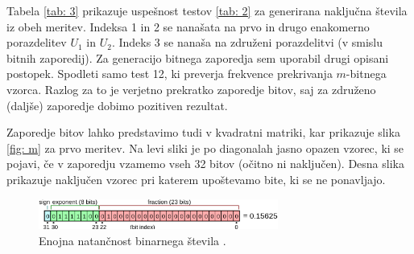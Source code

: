 \documentclass[11pt, oneside]{article}
\theoremstyle{definition}
\begin{document}
Tabela \ref{tab: 3} prikazuje uspešnost testov \ref{tab: 2} za generirana naključna števila iz obeh meritev.
Indeksa 1 in 2 se nanašata na prvo in drugo enakomerno porazdelitev $U_1$ in $U_2$.
Indeks 3 se nanaša na združeni porazdelitvi (v smislu bitnih zaporedij).
Za generacijo bitnega zaporedja sem uporabil drugi opisani postopek.
Spodleti samo test 12, ki preverja frekvence prekrivanja $m$-bitnega vzorca. Razlog za to je
verjetno prekratko zaporedje bitov, saj za združeno (daljše) zaporedje dobimo pozitiven rezultat.

Zaporedje bitov lahko predstavimo tudi v kvadratni matriki, kar prikazuje slika \ref{fig: m} za
prvo meritev. Na levi sliki je po diagonalah jasno opazen vzorec, ki se pojavi, če v zaporedju
vzamemo vseh 32 bitov (očitno ni naključen). Desna slika prikazuje naključen vzorec pri katerem upoštevamo bite, ki se
ne ponavljajo.

\newpage

\vspace*{-1cm}
\begin{figure}[h!]
    \centering
    \includegraphics[width=0.7\textwidth]{float.png}
    \caption{Enojna natančnost binarnega števila \cite{enwiki:floats}.}
    \label{fig: float}
\end{figure}
\end{document}
